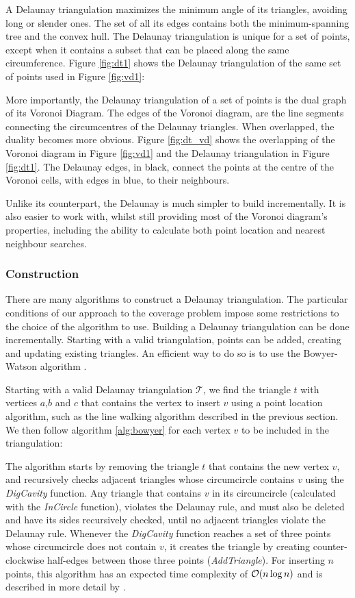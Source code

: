 A Delaunay triangulation maximizes the minimum angle of its triangles, avoiding long or slender ones.
The set of all its edges contains both the minimum-spanning tree and the convex hull.
The Delaunay triangulation is unique for a set of points, except when it contains a subset that can be placed along the same circumference. Figure \ref{fig:dt1} shows the Delaunay triangulation of the same set of points used in Figure \ref{fig:vd1}:

\noindent
More importantly, the Delaunay triangulation of a set of points is the dual graph of its Voronoi Diagram. The edges of the Voronoi diagram, are the line segments connecting the circumcentres of the Delaunay triangles. When overlapped, the duality becomes more obvious. Figure \ref{fig:dt_vd} shows the overlapping of the Voronoi diagram in Figure \ref{fig:vd1} and the Delaunay  triangulation in Figure \ref{fig:dt1}. The Delaunay edges, in black, connect the points at the centre of the Voronoi cells, with edges in blue, to their neighbours.

\noindent
Unlike its counterpart, the Delaunay is much simpler to build incrementally. It is also easier to work with, whilst still providing most of the Voronoi diagram's properties, including the ability to calculate both point location and nearest neighbour searches.
\subsubsection*{Construction}
\label{sect:dtconst}

There are many algorithms to construct a Delaunay triangulation. 
The particular conditions of our approach to the coverage problem impose some restrictions to the choice of the algorithm to use.
Building a Delaunay triangulation can be done incrementally. Starting with a valid triangulation, points can be added, creating and updating existing triangles. An efficient way to do so is to use the Bowyer-Watson algorithm \cite{bwalgo}.

Starting with a valid Delaunay triangulation $\mathcal{T}$, we find the triangle $t$ with vertices $a$,$b$ and $c$ that contains the vertex to insert $v$ using a point location algorithm, such as the line walking algorithm described in the previous section. We then follow algorithm \ref{alg:bowyer} for each vertex $v$ to be included in the triangulation:


The algorithm starts by removing the triangle $t$ that contains the new vertex $v$, and recursively checks adjacent triangles whose circumcircle contains $v$ using the \emph{DigCavity} function. Any triangle that contains $v$ in its circumcircle (calculated with the \emph{InCircle} function), violates the Delaunay rule, and must also be deleted and have its sides recursively checked, until no adjacent triangles violate the Delaunay rule. Whenever the \emph{DigCavity} function reaches a set of three points whose circumcircle does not contain $v$, it creates the triangle by creating counter-clockwise half-edges between those three points (\emph{AddTriangle}). For inserting $n$ points, this algorithm has an expected time complexity of $\mathcal{O}(n \log n)$ and is described in more detail by \citet{tricomplex}.

